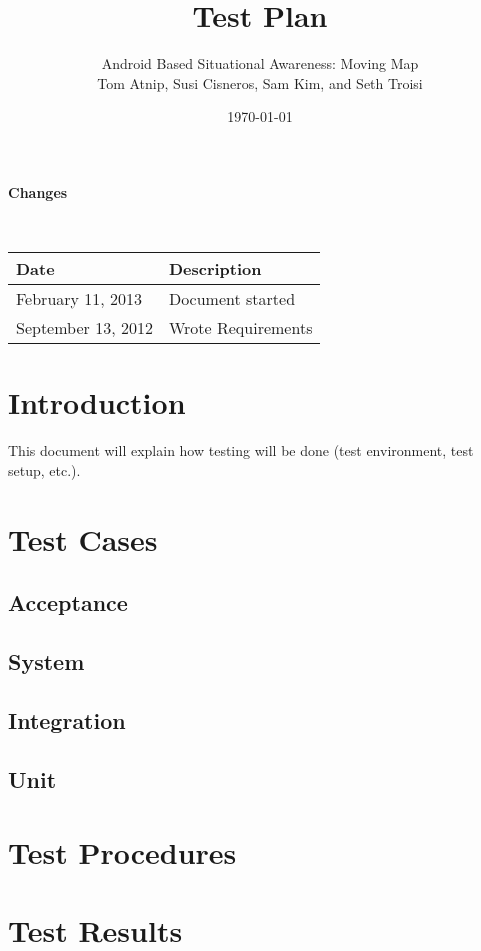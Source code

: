 \documentclass{article}
\begin{document}
\setlength{\voffset}{3.5in}
\title{Test Plan}
\author{\Large Android Based Situational Awareness: Moving Map\\
Tom Atnip, Susi Cisneros, Sam Kim, and Seth Troisi}
\date{\today}
\maketitle
\clearpage
\setlength{\voffset}{0pt}
\tableofcontents
\clearpage


\begin{Large}
\textbf{Changes}
\end{Large}
\\

\begin{tabular}{ | p{1.5in} | p{4.5in} | }
\hline
\textbf{Date} & \textbf{Description}\\
\hline
\hline
February 11, 2013 & Document started\\
\hline
September 13, 2012 & Wrote Requirements\\
\hline
\end{tabular}
\clearpage

\section{Introduction}
This document will explain how testing will be done (test environment, test setup, etc.).

\section{Test Cases}

\subsection{Acceptance}

\subsection{System}

\subsection{Integration}

\subsection{Unit}

\section{Test Procedures}

\section{Test Results}
\end{document}
